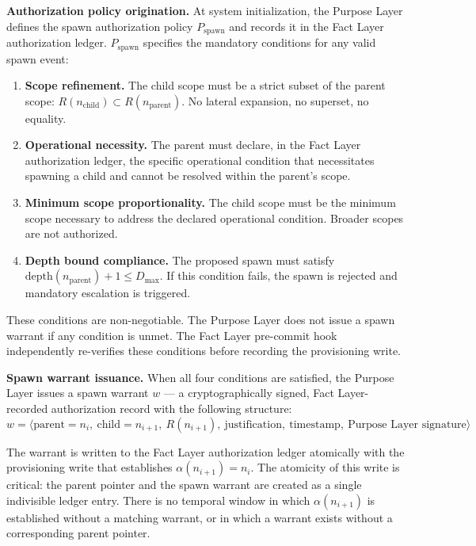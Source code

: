 \medskip
\noindent\textbf{Authorization policy origination.} At system initialization, the Purpose Layer defines the spawn authorization policy $P_{\text{spawn}}$ and records it in the Fact Layer authorization ledger. $P_{\text{spawn}}$ specifies the mandatory conditions for any valid spawn event:

\begin{enumerate}
    \item[(S1)] \textbf{Scope refinement.} The child scope must be a strict subset of the parent scope: $R(n_{\text{child}}) \subset R(n_{\text{parent}})$. No lateral expansion, no superset, no equality.
    \item[(S2)] \textbf{Operational necessity.} The parent must declare, in the Fact Layer authorization ledger, the specific operational condition that necessitates spawning a child and cannot be resolved within the parent's scope.
    \item[(S3)] \textbf{Minimum scope proportionality.} The child scope must be the minimum scope necessary to address the declared operational condition. Broader scopes are not authorized.
    \item[(S4)] \textbf{Depth bound compliance.} The proposed spawn must satisfy $\text{depth}(n_{\text{parent}}) + 1 \leq D_{\max}$. If this condition fails, the spawn is rejected and mandatory escalation is triggered.
\end{enumerate}

These conditions are non-negotiable. The Purpose Layer does not issue a spawn warrant if any condition is unmet. The Fact Layer pre-commit hook independently re-verifies these conditions before recording the provisioning write.

\medskip
\noindent\textbf{Spawn warrant issuance.} When all four conditions are satisfied, the Purpose Layer issues a spawn warrant $w$ — a cryptographically signed, Fact Layer-recorded authorization record with the following structure:
\begin{equation}
w = \bigl\langle \text{parent}=n_i,\ \text{child}=n_{i+1},\ R(n_{i+1}),\ \text{justification},\ \text{timestamp},\ \text{Purpose Layer signature} \bigr\rangle
\label{eq:spawn-warrant-structure}
\end{equation}

The warrant is written to the Fact Layer authorization ledger atomically with the provisioning write that establishes $\alpha(n_{i+1}) = n_i$. The atomicity of this write is critical: the parent pointer and the spawn warrant are created as a single indivisible ledger entry. There is no temporal window in which $\alpha(n_{i+1})$ is established without a matching warrant, or in which a warrant exists without a corresponding parent pointer.

